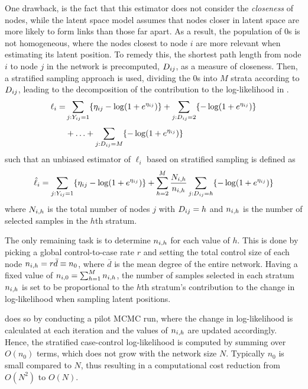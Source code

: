 One drawback, is the fact that this estimator does not consider the \emph{closeness} of nodes, while the latent space model assumes that nodes closer in latent space are more likely to form links than those far apart. As a result, the population of 0s is not homogeneous, where the nodes closest to node $i$ are more relevant when estimating its latent position. To remedy this, the shortest path length from node $i$ to node $j$ in the network is precomputed, $\sub(D)$, as a measure of closeness. Then, a stratified sampling approach is used, dividing the 0s into $M$ strata according to $\sub(D)$, leading to the decomposition of the contribution to the log-likelihood in .
\begin{equation}
\label{eq:case-stratified-likelihood}
    \setlength{\jot}{0.5\baselineskip}
    \begin{split}
        \ell_i = & \sum_{j:\sub(Y)=1} \{\sub(\eta)-\log(1+e^{\sub(\eta)}) \} + \sum_{j:\sub(D)=2} \{-\log(1+e^{\sub(\eta)}) \} \\
                 & + \ldots + \sum_{j:\sub(D)=M} \{-\log(1+e^{\sub(\eta)}) \}
    \end{split}
\end{equation}
such that an unbiased estimator of $\ell_i$ based on stratified sampling is defined as
\begin{equation}
\label{eq:case-stratified-estimate}
    \hat{\ell}_i = \sum_{j:\sub(Y)=1} \{\sub(\eta)-\log(1+e^{\sub(\eta)}) \} + \sum_{h=2}^M \frac{\sub(N)(i,h)}{\sub(n)(i,h)} \sum_{j:\sub(D)=h} \{-\log(1+e^{\sub(\eta)}) \}
\end{equation}
where $\sub(N)(i,h)$ is the total number of nodes $j$ with $\sub(D)=h$ and $\sub(n)(i,h)$ is the number of selected samples in the $h$th stratum.

The only remaining task is to determine $\sub(n)(i,h)$ for each value of $h$. 
This is done by picking a global control-to-case rate $r$ and setting the total control size of each node $\sub(n)(i,h)=r\bar{d}\equiv n_0$, where $\bar{d}$ is the mean degree of the entire network. Having a fixed value of $\sub(n)(i,0)=\sum_{h=1}^M\sub(n)(i,h)$, the number of samples selected in each stratum $\sub(n)(i,h)$ is set to be proportional to the $h$th stratum's contribution to the change in log-likelihood when sampling latent positions.

\citeauthor{raftery2012fast} does so by conducting a pilot MCMC run, where the change in log-likelihood is calculated at each iteration and the values of $\sub(n)(i,h)$ are updated accordingly. Hence, the stratified case-control log-likelihood is computed by summing over $O(n_0)$ terms, which does not grow with the network size $N$. Typically $n_0$ is small compared to $N$, thus resulting in a computational cost reduction from $O(N^2)$ to $O(N)$.


